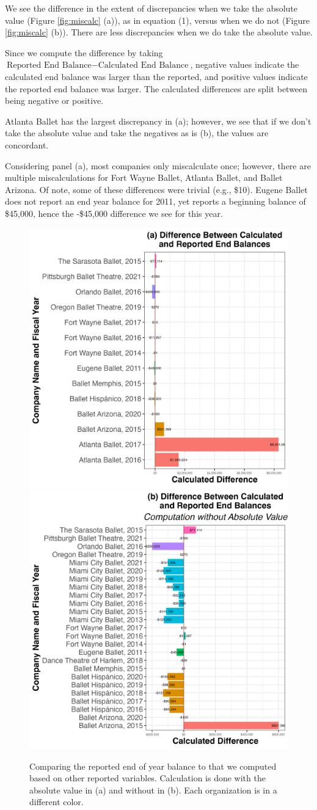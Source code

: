 \documentclass[Dance Data
Project,article,submit,moreauthors,pdftex]{mdpi}
\begin{document}
We see the difference in the extent of discrepancies when we take the
absolute value (Figure \ref{fig:miscalc} (a)), as in equation (1),
versus when we do not (Figure \ref{fig:miscalc} (b)). There are less
discrepancies when we do take the absolute value.

Since we compute the difference by taking
\(\text{Reported End Balance} - \text{Calculated End Balance}\),
negative values indicate the calculated end balance was larger than the
reported, and positive values indicate the reported end balance was
larger. The calculated differences are split between being negative or
positive.

Atlanta Ballet has the largest discrepancy in (a); however, we see that
if we don't take the absolute value and take the negatives as is (b),
the values are concordant.

Considering panel (a), most companies only miscalculate once; however,
there are multiple miscalculations for Fort Wayne Ballet, Atlanta
Ballet, and Ballet Arizona. Of note, some of these differences were
trivial (e.g., \$10). Eugene Ballet does not report an end year balance
for 2011, yet reports a beginning balance of \$45,000, hence the
-\$45,000 difference we see for this year.

\begin{figure}[H]
\includegraphics[width=0.5\linewidth,]{../images/diff_end_bal} \includegraphics[width=0.5\linewidth,]{../images/diff_end_bal_no_abs} \caption{\label{fig:miscalc}Comparing the reported end of year balance to that we computed based on other reported variables. Calculation is done with the absolute value in (a) and without in (b). Each organization is in a different color.}\label{fig:unnamed-chunk-3}
\end{figure}
\end{document}
